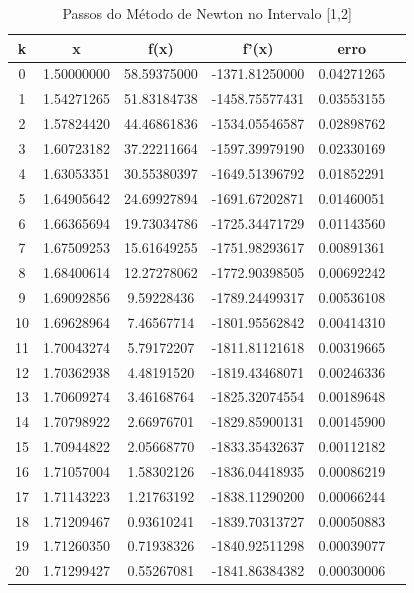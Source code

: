 \documentclass{article}
\begin{document}
\thispagestyle{empty} %
\begin{table}[ht!]
        \centering
        \caption{\large{Passos do Método de Newton no Intervalo [1,2]}}
        \label{Newton2}
        \begin{tabular}{|c|c| c| c| c |c |}
        \hline \textbf{k} & \textbf{x} & \textbf{f(x)} & \textbf{f'(x)} & \textbf{erro}\\
        \hline
 0  & 1.50000000 & 58.59375000  & -1371.81250000 & 0.04271265 \\
1  & 1.54271265 & 51.83184738  & -1458.75577431 & 0.03553155 \\
2  & 1.57824420 & 44.46861836  & -1534.05546587 & 0.02898762 \\
3  & 1.60723182 & 37.22211664  & -1597.39979190 & 0.02330169 \\
4  & 1.63053351 & 30.55380397  & -1649.51396792 & 0.01852291 \\
5  & 1.64905642 & 24.69927894  & -1691.67202871 & 0.01460051 \\
6  & 1.66365694 & 19.73034786  & -1725.34471729 & 0.01143560 \\
7  & 1.67509253 & 15.61649255  & -1751.98293617 & 0.00891361 \\
8  & 1.68400614 & 12.27278062  & -1772.90398505 & 0.00692242 \\
9  & 1.69092856 & 9.59228436   & -1789.24499317 & 0.00536108 \\
10 & 1.69628964 & 7.46567714   & -1801.95562842 & 0.00414310 \\
11 & 1.70043274 & 5.79172207   & -1811.81121618 & 0.00319665 \\
12 & 1.70362938 & 4.48191520   & -1819.43468071 & 0.00246336 \\
13 & 1.70609274 & 3.46168764   & -1825.32074554 & 0.00189648 \\
14 & 1.70798922 & 2.66976701   & -1829.85900131 & 0.00145900 \\
15 & 1.70944822 & 2.05668770   & -1833.35432637 & 0.00112182 \\
16 & 1.71057004 & 1.58302126   & -1836.04418935 & 0.00086219 \\
17 & 1.71143223 & 1.21763192   & -1838.11290200 & 0.00066244 \\
18 & 1.71209467 & 0.93610241   & -1839.70313727 & 0.00050883 \\
19 & 1.71260350 & 0.71938326   & -1840.92511298 & 0.00039077 \\
20 & 1.71299427 & 0.55267081   & -1841.86384382 & 0.00030006 \\

\end{tabular}
\end{table}
\end{document}
